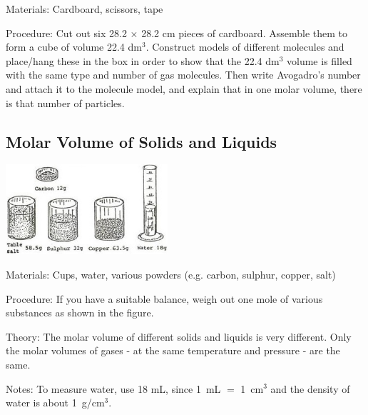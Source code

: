 \begin{multicols}{2}
\begin{description*}
\item[Materials:]{Cardboard, scissors, tape}
\item[Procedure:]{Cut out six 28.2 $\times$ 28.2 cm pieces of cardboard. Assemble them to form a cube of
volume 22.4 dm$^3$. Construct models of different
molecules and place/hang these in the box in
order to show that the 22.4 dm$^3$ volume is filled
with the same type and number of gas molecules.
Then write Avogadro's number and attach it to
the molecule model, and explain that in one
molar volume, there is that number of particles.}
\end{description*}

\subsection{Molar Volume of Solids and Liquids}

\begin{center}
\includegraphics[width=0.45\textwidth]{./img/source/molar-volumes-2.jpg}
\end{center}

\begin{description*}
\item[Materials:]{Cups, water, various powders (e.g. carbon, sulphur, copper, salt)}
\item[Procedure:]{If you have a suitable balance, weigh out one
mole of various substances as shown in the
figure.}
\item[Theory:]{The molar volume of different
solids and liquids is very different. Only the
molar volumes of gases - at the same temperature
and pressure - are the same.}
\item[Notes:]{To measure water, use 18 mL, since 1~mL $=$ 1~cm$^3$ and the density of water is about 1~g/cm$^3$.}
\end{description*}


\end{multicols}
